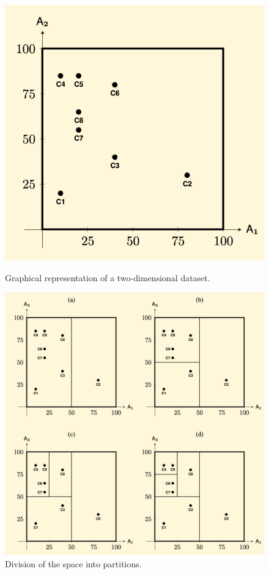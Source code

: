 \begin{figure}[ht]
\centering
\begin{minipage}{0.49\textwidth}
    \centering
    \includegraphics[width=0.5\linewidth]{img/multidim_start.png}
    \caption{Graphical representation of a two-dimensional dataset.}
    \label{fig:multidim-start}
\end{minipage}
\hfill
\begin{minipage}{0.49\textwidth}
    \centering
    \includegraphics[width=\linewidth]{img/multidim_index.png}
    \caption{Division of the space into partitions.}
    \label{fig:multidim-index}
\end{minipage}
\end{figure}

